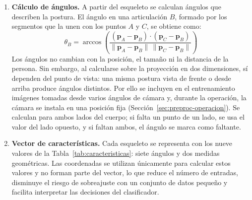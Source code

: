 \documentclass[12pt,a4paper,oneside]{book}
\theoremstyle{plain}
\theoremstyle{definition}
\theoremstyle{remark}
\begin{document}
\begin{enumerate}
  \begin{equation}
    \mathbf{p}'_i = \frac{\mathbf{p}_i - \mathbf{c}}{L}, \qquad L = \lVert \mathbf{s} - \mathbf{c} \rVert
  \end{equation}
  Si uno de los hombros o de las caderas falta, se utiliza el punto visible en lugar del punto medio. Cuando la persona queda acostada en dirección a la cámara, el torso se ve acortado y $L$ tiende a cero; para evitar divisiones entre valores muy pequeños, $L$ se acota inferiormente por $0{,}2$ veces la diagonal de la caja delimitadora de la persona. Así, el esqueleto no depende de la posición de la persona en la imagen ni de su distancia a la cámara.
  \item \textbf{Cálculo de ángulos.} A partir del esqueleto se calculan ángulos que describen la postura. El ángulo en una articulación $B$, formado por los segmentos que la unen con los puntos $A$ y $C$, se obtiene como:
  \begin{equation}
    \theta_B = \arccos\left(\frac{(\mathbf{p}_A - \mathbf{p}_B)\cdot(\mathbf{p}_C - \mathbf{p}_B)}{\lVert \mathbf{p}_A - \mathbf{p}_B \rVert\,\lVert \mathbf{p}_C - \mathbf{p}_B \rVert}\right)
  \end{equation}
  Los ángulos no cambian con la posición, el tamaño ni la distancia de la persona. Sin embargo, al calcularse sobre la proyección en dos dimensiones, sí dependen del punto de vista: una misma postura vista de frente o desde arriba produce ángulos distintos. Por ello se incluyen en el entrenamiento imágenes tomadas desde varios ángulos de cámara y, durante la operación, la cámara se instala en una posición fija (Sección~\ref{sec:preproc-operacion}). Se calculan para ambos lados del cuerpo; si falta un punto de un lado, se usa el valor del lado opuesto, y si faltan ambos, el ángulo se marca como faltante.
  \item \textbf{Vector de características.} Cada esqueleto se representa con los nueve valores de la Tabla~\ref{tab:caracteristicas}: siete ángulos y dos medidas geométricas. Las coordenadas se utilizan únicamente para calcular estos valores y no forman parte del vector, lo que reduce el número de entradas, disminuye el riesgo de sobreajuste con un conjunto de datos pequeño y facilita interpretar las decisiones del clasificador.

\end{enumerate}
\end{document}
